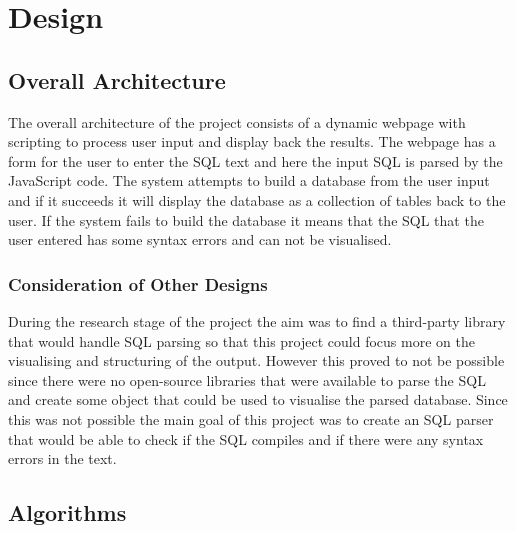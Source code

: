 \chapter{Design}

\section{Overall Architecture}

The overall architecture of the project consists of a dynamic webpage with scripting to process user input and display back the results. The webpage has a form for the user to enter the SQL text and here the input SQL is parsed by the JavaScript code. The system attempts to build a database from the user input and if it succeeds it will display the database as a collection of tables back to the user. If the system fails to build the database it means that the SQL that the user entered has some syntax errors and can not be visualised.


\subsection{Consideration of Other Designs}

During the research stage of the project the aim was to find a third-party library that would handle SQL parsing so that this project could focus more on the visualising and structuring of the output. However this proved to not be possible since there were no open-source libraries that were available to parse the SQL and create some object that could be used to visualise the parsed database. Since this was not possible the main goal of this project was to create an SQL parser that would be able to check if the SQL compiles and if there were any syntax errors in the text.


\section{Algorithms}

